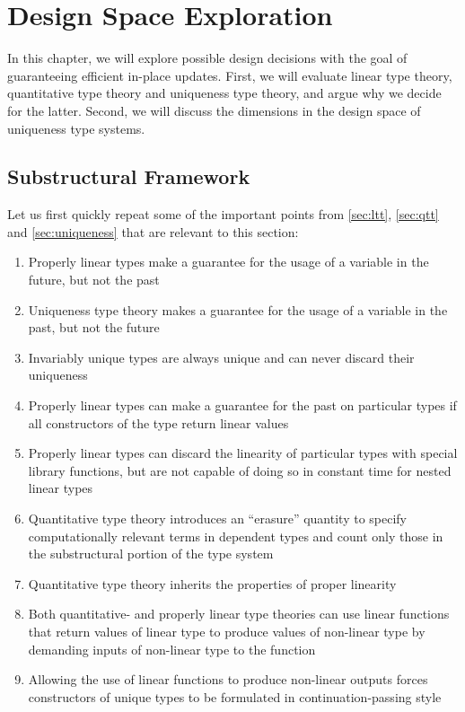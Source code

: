 \chapter{Design Space Exploration}\label{sec:designspace}
In this chapter, we will explore possible design decisions with the goal of guaranteeing efficient in-place updates. First, we will evaluate linear type theory, quantitative type theory and uniqueness type theory, and argue why we decide for the latter. Second, we will discuss the dimensions in the design space of uniqueness type systems.

\section{Substructural Framework}
Let us first quickly repeat some of the important points from \cref{sec:ltt}, \cref{sec:qtt} and \cref{sec:uniqueness} that are relevant to this section:
\begin{enumerate}
	\item Properly linear types make a guarantee for the usage of a variable in the future, but not the past
	\item Uniqueness type theory makes a guarantee for the usage of a variable in the past, but not the future
	\item Invariably unique types are always unique and can never discard their uniqueness
	\item Properly linear types can make a guarantee for the past on particular types if all constructors of the type return linear values
	\item Properly linear types can discard the linearity of particular types with special library functions, but are not capable of doing so in constant time for nested linear types
	\item Quantitative type theory introduces an ``erasure'' quantity to specify computationally relevant terms in dependent types and count only those in the substructural portion of the type system
	\item Quantitative type theory inherits the properties of proper linearity
	\item Both quantitative- and properly linear type theories can use linear functions that return values of linear type to produce values of non-linear type by demanding inputs of non-linear type to the function
	\item Allowing the use of linear functions to produce non-linear outputs forces constructors of unique types to be formulated in continuation-passing style
\end{enumerate}

